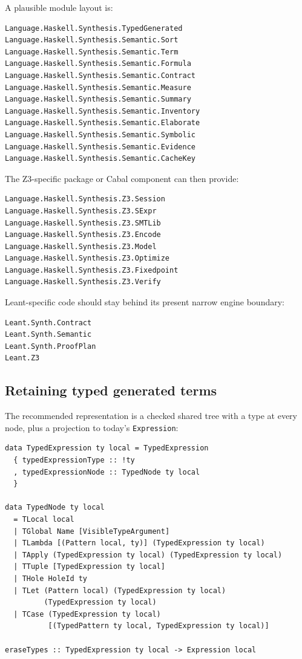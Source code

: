 \documentclass[11pt,oneside]{article}
\newcommand{\code}[1]{\texttt{#1}}
\begin{document}
A plausible module layout is:

\begin{lstlisting}[language=HaskellExt]
Language.Haskell.Synthesis.TypedGenerated
Language.Haskell.Synthesis.Semantic.Sort
Language.Haskell.Synthesis.Semantic.Term
Language.Haskell.Synthesis.Semantic.Formula
Language.Haskell.Synthesis.Semantic.Contract
Language.Haskell.Synthesis.Semantic.Measure
Language.Haskell.Synthesis.Semantic.Summary
Language.Haskell.Synthesis.Semantic.Inventory
Language.Haskell.Synthesis.Semantic.Elaborate
Language.Haskell.Synthesis.Semantic.Symbolic
Language.Haskell.Synthesis.Semantic.Evidence
Language.Haskell.Synthesis.Semantic.CacheKey
\end{lstlisting}

The Z3-specific package or Cabal component can then provide:

\begin{lstlisting}[language=HaskellExt]
Language.Haskell.Synthesis.Z3.Session
Language.Haskell.Synthesis.Z3.SExpr
Language.Haskell.Synthesis.Z3.SMTLib
Language.Haskell.Synthesis.Z3.Encode
Language.Haskell.Synthesis.Z3.Model
Language.Haskell.Synthesis.Z3.Optimize
Language.Haskell.Synthesis.Z3.Fixedpoint
Language.Haskell.Synthesis.Z3.Verify
\end{lstlisting}

Leant-specific code should stay behind its present narrow engine boundary:

\begin{lstlisting}[language=HaskellExt]
Leant.Synth.Contract
Leant.Synth.Semantic
Leant.Synth.ProofPlan
Leant.Z3
\end{lstlisting}

\subsection{Retaining typed generated terms}

The recommended representation is a checked shared tree with a type at every node,
plus a projection to today's \code{Expression}:

\begin{lstlisting}[language=HaskellExt,caption={One possible typed output boundary}]
data TypedExpression ty local = TypedExpression
  { typedExpressionType :: !ty
  , typedExpressionNode :: TypedNode ty local
  }

data TypedNode ty local
  = TLocal local
  | TGlobal Name [VisibleTypeArgument]
  | TLambda [(Pattern local, ty)] (TypedExpression ty local)
  | TApply (TypedExpression ty local) (TypedExpression ty local)
  | TTuple [TypedExpression ty local]
  | THole HoleId ty
  | TLet (Pattern local) (TypedExpression ty local)
         (TypedExpression ty local)
  | TCase (TypedExpression ty local)
          [(TypedPattern ty local, TypedExpression ty local)]

eraseTypes :: TypedExpression ty local -> Expression local
\end{lstlisting}
\end{document}
